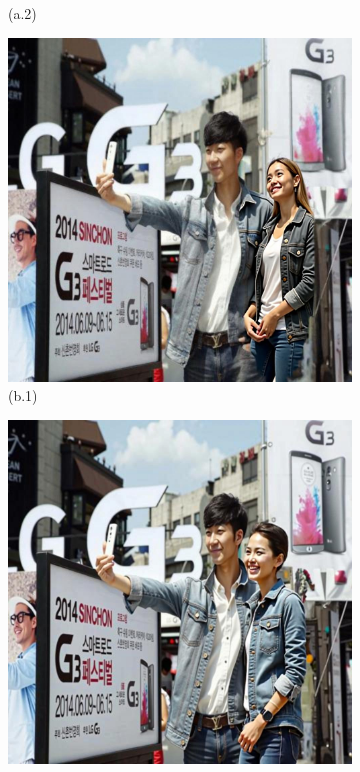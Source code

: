 \documentclass{article}
\begin{document}
\begin{figure}[htbp]
\begin{subfigure}[b]{0.2\textwidth}
        \caption*{(a.2)}
    \end{subfigure}
    \begin{subfigure}[b]{0.2\textwidth}
        \includegraphics[width=\linewidth]{figures/tm/3941.jpeg}
        \caption*{(b.1)}
    \end{subfigure}
    \begin{subfigure}[b]{0.2\textwidth}
        \includegraphics[width=\linewidth]{figures/tm/image5.jpeg}

\end{subfigure}
\end{figure}
\end{document}
